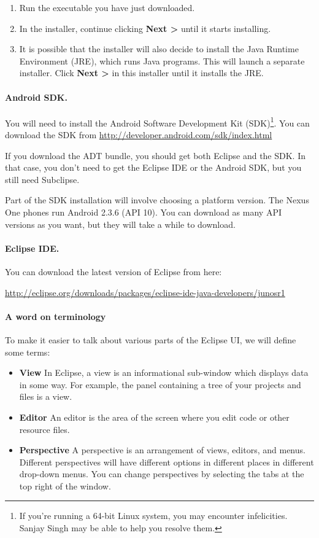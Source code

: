 \documentclass[10pt]{article}
\begin{document}
\begin{enumerate}
\item Run the executable you have just downloaded.
\item In the installer, continue clicking \textbf{Next >} until it starts installing.
\item It is possible that the installer will also decide to install the Java Runtime Environment (JRE), which runs Java programs. This will launch a separate installer. Click \textbf{Next >} in this installer until it installs the JRE.
\end{enumerate}

\paragraph{Android SDK.}
You will need to install the Android Software Development Kit (SDK)\footnote{If you're running a 64-bit Linux system, you may encounter infelicities. Sanjay Singh may be able to help you resolve them.}. You can download the SDK from \url{http://developer.android.com/sdk/index.html}

If you download the ADT bundle, you should get both Eclipse and the SDK. In that case, you don't need to get the Eclipse IDE or the Android SDK, but you still need Subclipse.

Part of the SDK installation will involve choosing a platform version. The Nexus One phones run Android 2.3.6 (API 10). You can download as many API versions as you want, but they will take a while to download.

\paragraph{Eclipse IDE.}
You can download the latest version of Eclipse from here: 

\qquad \url{http://eclipse.org/downloads/packages/eclipse-ide-java-developers/junosr1}

\paragraph{A word on terminology}
To make it easier to talk about various parts of the Eclipse UI, we will define some terms:

\begin{itemize}
\item \textbf{View} In Eclipse, a view is an informational sub-window which displays data in some way. For example, the panel containing a tree of your projects and files is a view.
\item \textbf{Editor} An editor is the area of the screen where you edit code or other resource files.
\item \textbf{Perspective} A perspective is an arrangement of views, editors, and menus. Different perspectives will have different options in different places in different drop-down menus. You can change perspectives by selecting the tabs at the top right of the window. 
\end{itemize}
\end{document}
